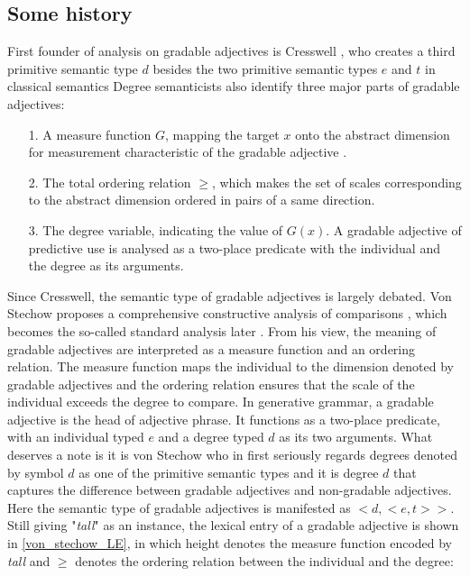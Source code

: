 \documentclass{ctexart}
\let \cite \parencite
\begin{document}
\subsection{Some history}

First founder of analysis on gradable adjectives is Cresswell \cite{cresswell1976}, who creates a third primitive semantic type $d$ besides the two primitive semantic types $e$ and $t$ in classical semantics Degree semanticists also identify three major parts of gradable adjectives:

\begin{itemize}
    \item[1.] A measure function $G$, mapping the target $x$ onto the abstract dimension for measurement characteristic of the gradable adjective \cite{bartsch1974}.
    \item[2.] The total ordering relation $\geq$, which makes the set of scales corresponding to the abstract dimension ordered in pairs of a same direction.
    \item[3.] The degree variable, indicating the value of $G(x)$. A gradable adjective of predictive use is analysed as a two-place predicate with the individual and the degree as its arguments.
\end{itemize}

Since Cresswell, the semantic type of gradable adjectives is largely debated. Von Stechow proposes a comprehensive constructive analysis of comparisons \cite{von1984a}, which becomes the so-called standard analysis later \cite{bale2011}. From his view, the meaning of gradable adjectives are interpreted as a measure function and an ordering relation. The measure function maps the individual to the dimension denoted by gradable adjectives and the ordering relation ensures that the scale of the individual exceeds the degree to compare. In generative grammar, a gradable adjective is the head of adjective phrase. It functions as a two-place predicate, with an individual typed $e$ and a degree typed $d$ as its two arguments. What deserves a note is it is von Stechow who in first seriously regards degrees denoted by symbol $d$ as one of the primitive semantic types and it is degree $d$ that captures the difference between gradable adjectives and non-gradable adjectives. Here the semantic type of gradable adjectives is manifested as $<d,<e,t>>$. Still giving "\textit{tall}" as an instance, the lexical entry of a gradable adjective is shown in \ref{von_stechow_LE}, in which height denotes the measure function encoded by \textit{tall} and $\geq$ denotes the ordering relation between the individual and the degree:
\end{document}
